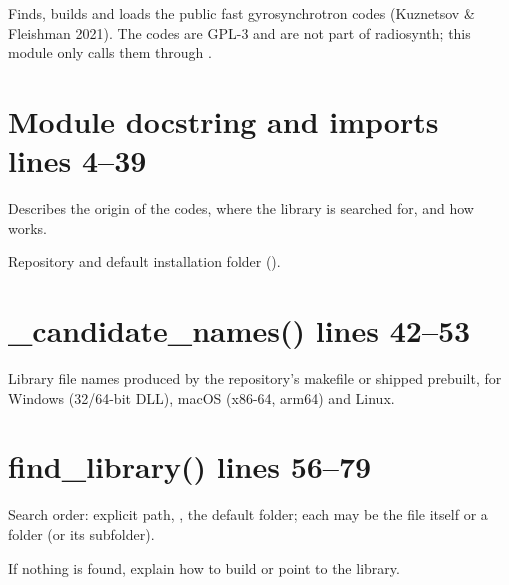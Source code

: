 Finds, builds and loads the public fast gyrosynchrotron codes (Kuznetsov \& Fleishman
2021). The codes are GPL-3 and are not part of radiosynth; this module only calls them
through .

\section*{\normalsize Module docstring and imports \hfill{\small\mdseries\color{gray}lines 4--39}}

Describes the origin of the codes, where the library is searched for, and how  works.

\begin{lines}
\item[L.36–37] Repository and default installation folder ().
\end{lines}
\section*{\normalsize \_candidate\_names() \hfill{\small\mdseries\color{gray}lines 42--53}}

Library file names produced by the repository's makefile or shipped prebuilt, for Windows (32/64-bit DLL), macOS (x86-64, arm64) and Linux.

\section*{\normalsize find\_library() \hfill{\small\mdseries\color{gray}lines 56--79}}

\begin{lines}
\item[L.60–69] Search order: explicit path, , the default folder; each may be the file itself or a folder (or its  subfolder).
\item[L.57] If nothing is found, explain how to build or point to the library.
\end{lines}
